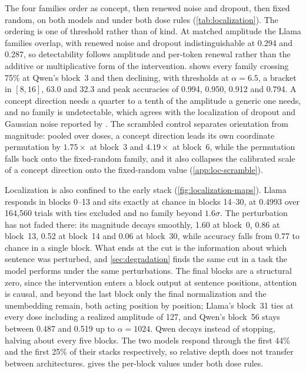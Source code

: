 The four families order as concept, then renewed noise and dropout, then
fixed random, on both models and under both dose rules
(\cref{tab:localization}). The ordering is one of threshold rather than of
kind. At matched amplitude the Llama families overlap, with renewed noise and
dropout indistinguishable at 0.294 and 0.287, so detectability follows
amplitude and per-token renewal rather than the additive or multiplicative
form of the intervention.  shows every family
crossing 75\% at Qwen's block~3 and then declining, with thresholds at
$\alpha=6.5$, a bracket in $[8,16]$, 63.0 and 32.3 and peak accuracies of
0.994, 0.950, 0.912 and 0.794. A concept direction needs a quarter to a tenth
of the amplitude a generic one needs, and no family is undetectable, which
agrees with the localization of dropout and Gaussian noise reported by
\citet{fornasiere2026}. The scrambled control separates orientation from
magnitude: pooled over doses, a concept direction leads its own coordinate
permutation by $1.75\times$ at block~3 and $4.19\times$ at block~6, while the
permutation falls back onto the fixed-random family, and it also collapses
the calibrated scale of a concept direction onto the fixed-random value
(\cref{app:loc-scramble}).

Localization is also confined to the early stack
(\cref{fig:localization-maps}). Llama responds in blocks 0--13 and sits
exactly at chance in blocks 14--30, at 0.4993 over 164,560 trials with ties
excluded and no family beyond $1.6\sigma$. The perturbation has not faded
there: its magnitude decays smoothly, 1.60 at block~0, 0.86 at block~13,
0.52 at block~14 and 0.06 at block~30, while accuracy falls from 0.77 to
chance in a single block. What ends at the cut is the information about which
sentence was perturbed, and \cref{sec:degradation} finds the same cut in a
task the model performs under the same perturbations. The final blocks are a structural zero, since the
intervention enters a block output at sentence positions, attention is
causal, and beyond the last block only the final normalization and the
unembedding remain, both acting position by position; Llama's block~31 ties
at every dose including a realized amplitude of 127, and Qwen's block~56
stays between 0.487 and 0.519 up to $\alpha=1024$. Qwen decays instead of
stopping, halving about every five blocks. The two models respond through the
first 44\% and the first 25\% of their stacks respectively, so relative depth
does not transfer between architectures.  gives the
per-block values under both dose rules.

